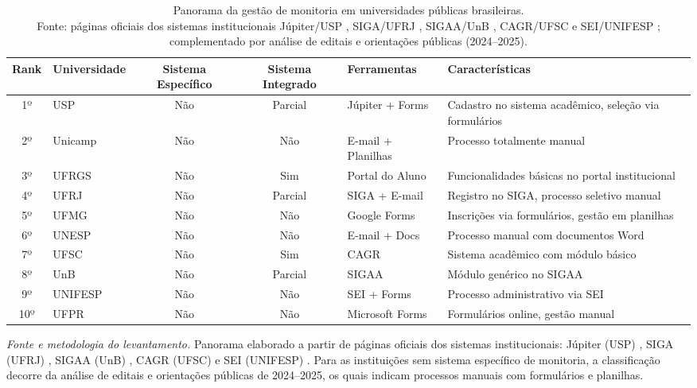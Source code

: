 \documentclass[portuguese]{sbc2025}%
\begin{document}
\begin{table}[htb]
  \centering
\caption{Panorama da gestão de monitoria em universidades públicas brasileiras.\\Fonte: páginas oficiais dos sistemas institucionais Júpiter/USP \cite{USPJupiter}, SIGA/UFRJ \cite{UFRJ_SIGA}, SIGAA/UnB \cite{UnB_SIGAA}, CAGR/UFSC \cite{UFSC_CAGR} e SEI/UNIFESP \cite{UNIFESP_SEI}; complementado por análise de editais e orientações públicas (2024--2025).}
  \label{tab:estado-pratica}
  \begin{adjustbox}{max width=\textwidth}
    \begin{tabular}{|c|l|c|c|p{3cm}|p{5cm}|}
      \hline
      \textbf{Rank} & \textbf{Universidade} & \textbf{Sistema Específico} & \textbf{Sistema Integrado} & \textbf{Ferramentas} & \textbf{Características} \\
      \hline
      1º & USP & Não & Parcial & Júpiter + Forms & Cadastro no sistema acadêmico, seleção via formulários \\
      \hline
      2º & Unicamp & Não & Não & E-mail + Planilhas & Processo totalmente manual \\
      \hline
      3º & UFRGS & Não & Sim & Portal do Aluno & Funcionalidades básicas no portal institucional \\
      \hline
      4º & UFRJ & Não & Parcial & SIGA + E-mail & Registro no SIGA, processo seletivo manual \\
      \hline
      5º & UFMG & Não & Não & Google Forms & Inscrições via formulários, gestão em planilhas \\
      \hline
      6º & UNESP & Não & Não & E-mail + Docs & Processo manual com documentos Word \\
      \hline
      7º & UFSC & Não & Sim & CAGR & Sistema acadêmico com módulo básico \\
      \hline
      8º & UnB & Não & Parcial & SIGAA & Módulo genérico no SIGAA \\
      \hline
      9º & UNIFESP & Não & Não & SEI + Forms & Processo administrativo via SEI \\
      \hline
      10º & UFPR & Não & Não & Microsoft Forms & Formulários online, gestão manual \\
      \hline
    \end{tabular}
  \end{adjustbox}
\end{table}

\noindent\textit{Fonte e metodologia do levantamento.} Panorama elaborado a partir de páginas oficiais dos sistemas institucionais: Júpiter (USP) \cite{USPJupiter}, SIGA (UFRJ) \cite{UFRJ_SIGA}, SIGAA (UnB) \cite{UnB_SIGAA}, CAGR (UFSC) \cite{UFSC_CAGR} e SEI (UNIFESP) \cite{UNIFESP_SEI}. Para as instituições sem sistema específico de monitoria, a classificação decorre da análise de editais e orientações públicas de 2024--2025, os quais indicam processos manuais com formulários e planilhas.
\end{document}
